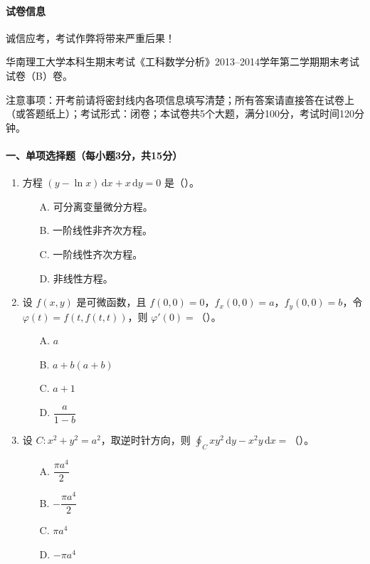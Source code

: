 \paragraph*{试卷信息}
诚信应考，考试作弊将带来严重后果！

华南理工大学本科生期末考试《工科数学分析》2013--2014学年第二学期期末考试试卷（B）卷。

注意事项：开考前请将密封线内各项信息填写清楚；所有答案请直接答在试卷上（或答题纸上）；考试形式：闭卷；本试卷共5个大题，满分100分，考试时间120分钟。

\paragraph*{一、单项选择题（每小题3分，共15分）}
\begin{enumerate}
  \item 方程 \((y-\ln x)\,\mathrm{d}x+x\,\mathrm{d}y=0\) 是（\quad）。
  \begin{enumerate}
    \item[A.] 可分离变量微分方程。
    \item[B.] 一阶线性非齐次方程。
    \item[C.] 一阶线性齐次方程。
    \item[D.] 非线性方程。
  \end{enumerate}

  \item 设 \(f(x,y)\) 是可微函数，且 \(f(0,0)=0\)，\(f_x(0,0)=a\)，\(f_y(0,0)=b\)，令
  \(\varphi(t)=f(t,f(t,t))\)，则 \(\varphi'(0)=\)（\quad）。
  \begin{enumerate}
    \item[A.] \(a\)
    \item[B.] \(a+b(a+b)\)
    \item[C.] \(a+1\)
    \item[D.] \(\dfrac{a}{1-b}\)
  \end{enumerate}

  \item 设 \(C:x^2+y^2=a^2\)，取逆时针方向，则
  \(\displaystyle \oint_C xy^2\,\mathrm{d}y-x^2y\,\mathrm{d}x=\)（\quad）。
  \begin{enumerate}
    \item[A.] \(\dfrac{\pi a^4}{2}\)
    \item[B.] \(-\dfrac{\pi a^4}{2}\)
    \item[C.] \(\pi a^4\)
    \item[D.] \(-\pi a^4\)
  \end{enumerate}


\end{enumerate}
